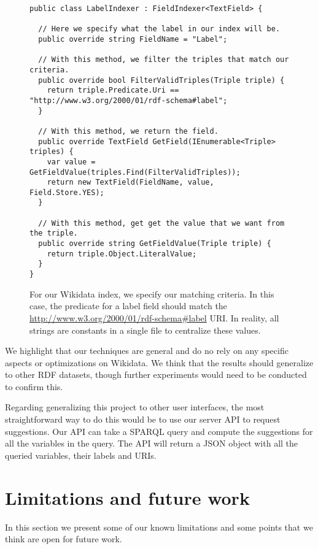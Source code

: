 \begin{figure}[H]
\begin{verbatim}
public class LabelIndexer : FieldIndexer<TextField> {

  // Here we specify what the label in our index will be.
  public override string FieldName = "Label";

  // With this method, we filter the triples that match our criteria.
  public override bool FilterValidTriples(Triple triple) {
    return triple.Predicate.Uri == "http://www.w3.org/2000/01/rdf-schema#label";
  }

  // With this method, we return the field.
  public override TextField GetField(IEnumerable<Triple> triples) {
    var value = GetFieldValue(triples.Find(FilterValidTriples));
    return new TextField(FieldName, value, Field.Store.YES);
  }

  // With this method, get get the value that we want from the triple.
  public override string GetFieldValue(Triple triple) {
    return triple.Object.LiteralValue;
  }
}
\end{verbatim}
\caption{For our Wikidata index, we specify our matching criteria. In this case, the predicate for a label field should match the \url{http://www.w3.org/2000/01/rdf-schema\#label} URI. In reality, all strings are constants in a single file to centralize these values.}
\label{fig:extendingIndex}
\end{figure}

We highlight that our techniques are general and do no rely on any specific aspects or optimizations on Wikidata. We think that the results should generalize to other RDF datasets, though further experiments would need to be conducted to confirm this.

Regarding generalizing this project to other user interfaces, the most straightforward way to do this would be to use our server API to request suggestions.
Our API can take a SPARQL query and compute the suggestions for all the variables in the query. The API will return a JSON object with all the queried variables, their labels and URIs.

\section{Limitations and future work}
\label{chap:futureWork}

In this section we present some of our known limitations and some points that we think are open for future work.

